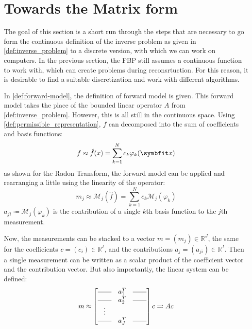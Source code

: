 
\section{Towards the Matrix form}\label{sec:matrix_formulation}

The goal of this section is a short run through the steps that are necessary to go form the
continuous definition of the inverse problem as given in \autoref{def:inverse_problem} to a discrete
version, with which we can work on computers. In the previous section, the FBP still assumes a
continuous function to work with, which can create problems during reconsrtuction. For this reason,
it is desirable to find a suitable discretization and work with different algorithms.

In \autoref{def:forward-model}, the definition of forward model is given. This forward model
takes the place of the bounded linear operator \(A\) from \autoref{def:inverse_problem}. However,
this is all still in the continuous space. Using \autoref{def:permissible_representation}, \(f\) can
decomposed into the sum of coefficients and basis functions:
\[ f \approx \near{f}(x) = \sum_{k=1}^{N} c_k \varphi_k(\mvec{x}) \]
as shown for the Radon Transform, the forward model can be applied and rearranging a little using
the linearity of the operator:
\[ m_j \approx \mathscr{M}_j(\hat{f}) = \sum_{k=1}^{N} c_k \mathscr{M}_j(\varphi_k) \]
\(a_{ji} \coloneq \mathscr{M}_j(\varphi_k)\) is the contribution of a single \(k\)th basis function
to the \(j\)th measurement.


Now, the measurements can be stacked to a vector \(m = (m_j) \in \mathbb{R}^J\), the same for
the coefficients \(c = (c_i) \in \mathbb{R}^I\), and the contributions \(a_{j} = (a_{ji}) \in
\mathbb{R}^I\). Then a single measurement can be written as a scalar product of the coefficient
vector and the contribution vector. But also importantly, the linear system can be defined:
\begin{equation}\label{eq:system_lin_equation}
	m \approx
	\begin{bmatrix}
		\rule[.5ex]{2em}{0.4pt} & a_1^T & \rule[.5ex]{2em}{0.4pt} \\
		\rule[.5ex]{2em}{0.4pt} & a_2^T & \rule[.5ex]{2em}{0.4pt} \\
		\vdots                                                    \\
		\rule[.5ex]{2em}{0.4pt} & a_J^T & \rule[.5ex]{2em}{0.4pt}
	\end{bmatrix} c \eqcolon A c
\end{equation}

